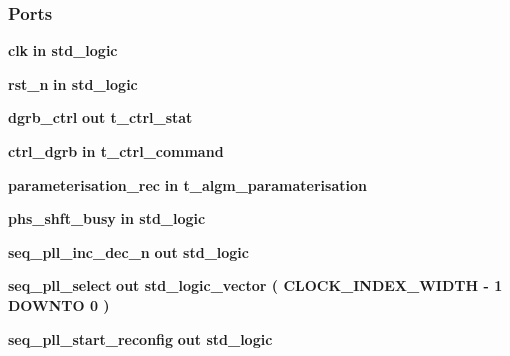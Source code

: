 \subsubsection*{Ports}
 \begin{DoxyCompactItemize}
\item 
{\bf clk}  {\bfseries {\bfseries \textcolor{keywordflow}{in}\textcolor{vhdlchar}{ }}} {\bfseries \textcolor{comment}{std\+\_\+logic}\textcolor{vhdlchar}{ }} 
\item 
{\bf rst\+\_\+n}  {\bfseries {\bfseries \textcolor{keywordflow}{in}\textcolor{vhdlchar}{ }}} {\bfseries \textcolor{comment}{std\+\_\+logic}\textcolor{vhdlchar}{ }} 
\item 
{\bf dgrb\+\_\+ctrl}  {\bfseries {\bfseries \textcolor{keywordflow}{out}\textcolor{vhdlchar}{ }}} {\bfseries {\bfseries {\bf t\+\_\+ctrl\+\_\+stat}} \textcolor{vhdlchar}{ }} 
\item 
{\bf ctrl\+\_\+dgrb}  {\bfseries {\bfseries \textcolor{keywordflow}{in}\textcolor{vhdlchar}{ }}} {\bfseries {\bfseries {\bf t\+\_\+ctrl\+\_\+command}} \textcolor{vhdlchar}{ }} 
\item 
{\bf parameterisation\+\_\+rec}  {\bfseries {\bfseries \textcolor{keywordflow}{in}\textcolor{vhdlchar}{ }}} {\bfseries {\bfseries {\bf t\+\_\+algm\+\_\+paramaterisation}} \textcolor{vhdlchar}{ }} 
\item 
{\bf phs\+\_\+shft\+\_\+busy}  {\bfseries {\bfseries \textcolor{keywordflow}{in}\textcolor{vhdlchar}{ }}} {\bfseries \textcolor{comment}{std\+\_\+logic}\textcolor{vhdlchar}{ }} 
\item 
{\bf seq\+\_\+pll\+\_\+inc\+\_\+dec\+\_\+n}  {\bfseries {\bfseries \textcolor{keywordflow}{out}\textcolor{vhdlchar}{ }}} {\bfseries \textcolor{comment}{std\+\_\+logic}\textcolor{vhdlchar}{ }} 
\item 
{\bf seq\+\_\+pll\+\_\+select}  {\bfseries {\bfseries \textcolor{keywordflow}{out}\textcolor{vhdlchar}{ }}} {\bfseries \textcolor{comment}{std\+\_\+logic\+\_\+vector}\textcolor{vhdlchar}{ }\textcolor{vhdlchar}{(}\textcolor{vhdlchar}{ }\textcolor{vhdlchar}{ }\textcolor{vhdlchar}{ }\textcolor{vhdlchar}{ }{\bfseries {\bf C\+L\+O\+C\+K\+\_\+\+I\+N\+D\+E\+X\+\_\+\+W\+I\+D\+TH}} \textcolor{vhdlchar}{-\/}\textcolor{vhdlchar}{ } \textcolor{vhdldigit}{1} \textcolor{vhdlchar}{ }\textcolor{keywordflow}{D\+O\+W\+N\+TO}\textcolor{vhdlchar}{ }\textcolor{vhdlchar}{ } \textcolor{vhdldigit}{0} \textcolor{vhdlchar}{ }\textcolor{vhdlchar}{)}\textcolor{vhdlchar}{ }} 
\item 
{\bf seq\+\_\+pll\+\_\+start\+\_\+reconfig}  {\bfseries {\bfseries \textcolor{keywordflow}{out}\textcolor{vhdlchar}{ }}} {\bfseries \textcolor{comment}{std\+\_\+logic}\textcolor{vhdlchar}{ }} 

\end{DoxyCompactItemize}
